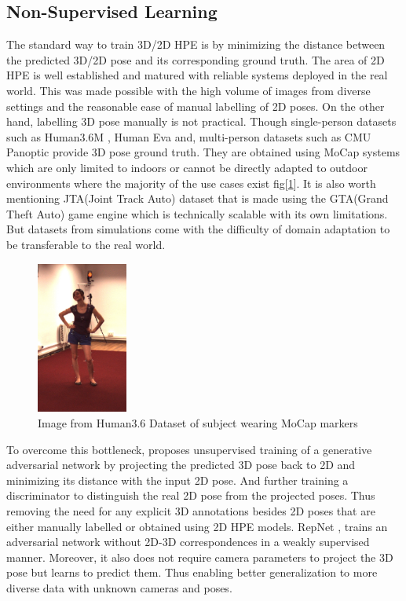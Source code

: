 \subsection{Non-Supervised Learning}

The standard way to train 3D/2D \ac{HPE} is by minimizing the distance between the predicted 3D/2D pose and its corresponding ground truth. The area of 2D \ac{HPE} is well established and matured with reliable systems deployed in the real world. This was made possible with the high volume of images from diverse settings and the reasonable ease of manual labelling of 2D poses. On the other hand, labelling 3D pose manually is not practical. Though single-person datasets such as Human3.6M \cite{H3.6}, Human Eva \cite{HumanEva} and, multi-person datasets such as CMU Panoptic \cite{cmuPanoptic} provide 3D pose ground truth. They are obtained using \ac{MoCap} systems which are only limited to indoors or cannot be directly adapted to outdoor environments where the majority of the use cases exist fig[\ref{fig:h36_mocap}]. It is also worth mentioning JTA(Joint Track Auto) dataset \cite{JTA} that is made using the GTA(Grand Theft Auto) game engine which is technically scalable with its own limitations. But datasets from simulations come with the difficulty of domain adaptation to be transferable to the real world.

\begin{figure}[!h]
    \centering
    \includegraphics[width=30mm]{figures/h36_mocap.png}
    \caption{Image from Human3.6 Dataset \cite{H3.6} of subject wearing \ac{MoCap} markers}
    \label{fig:h36_mocap}
\end{figure}

To overcome this bottleneck, \cite{unsupervisedAdversarial} proposes unsupervised training of a generative adversarial network by projecting the predicted 3D pose back to 2D and minimizing its distance with the input 2D pose. And further training a discriminator to distinguish the real 2D pose from the projected poses. Thus removing the need for any explicit 3D annotations besides 2D poses that are either manually labelled or obtained using 2D \ac{HPE} models. RepNet \cite{repnet}, trains an adversarial network without 2D-3D correspondences in a weakly supervised manner. Moreover, it also does not require camera parameters to project the 3D pose but learns to predict them. Thus enabling better generalization to more diverse data with unknown cameras and poses.

